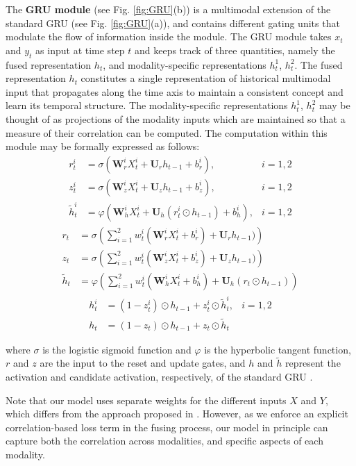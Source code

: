 \documentclass[10pt,twocolumn,letterpaper]{article}
\begin{document}
The \textbf{GRU module} (see Fig. \ref{fig:GRU}(b)) is a multimodal extension of the standard GRU (see Fig. \ref{fig:GRU}(a)), and contains different gating units that modulate the flow of information inside the module. The GRU module takes $x_t$ and $y_t$ as input at time step $t$ and keeps track of three quantities, namely the fused representation $h_t$, and modality-specific representations $h_t^1$, $h_t^2$. The fused representation $h_t$ constitutes a single representation of historical multimodal input that propagates along the time axis to maintain a consistent concept and learn its temporal structure. The modality-specific representations $h_t^1$, $h_t^2$ may be thought of as projections of the modality inputs which are maintained so that a measure of their correlation can be computed. The computation within this module may be formally expressed as follows:
\begin{align}
r_t^i &=\sigma \left( \textbf{W}_r^i  X_t^i + \textbf{U}_r  h_{t-1} + b_r^i\right ),& i=1, 2 \\
z_t^i &=\sigma \left( \textbf{W}_z^i  X_t^i + \textbf{U}_z  h_{t-1} + b_z^i\right ),& i=1, 2 \\
\tilde{h}_t^i &= \varphi \left( \textbf{W}_h^i  X_t^i + \textbf{U}_h  (r_t^i \odot h_{t-1}) + b_h^i \right),&  i=1, 2
\end{align}
\begin{align}
r_t &=\sigma \left( \sum_{i=1}^2 w_t^i \left (\textbf{W}_r^i  X_t^i + b_r^i\right) + \textbf{U}_r  h_{t-1}) \right)\\
z_t &=\sigma \left( \sum_{i=1}^2 w_t^i \left (\textbf{W}_z^i  X_t^i + b_z^i\right) + \textbf{U}_z  h_{t-1}) \right)\\
\tilde{h}_t &= \varphi \left( \sum_{i=1}^2 w_t^i \left( \textbf{W}_h^i  X_t^i + b_h^i \right) + \textbf{U}_h  (r_t \odot h_{t-1}) \right)
\end{align}
\begin{align}
h_t^i &= (1 - z_t^i) \odot h_{t-1} +  z_t^i \odot \tilde{h}_t^i, & i=1,2\\
h_t &= (1 - z_t) \odot h_{t-1} + z_t \odot \tilde{h}_t
\end{align}

\noindent where $\sigma$ is the logistic sigmoid function and $\varphi$ is the hyperbolic tangent function, $r$ and $z$ are the input to the reset and update gates, and $h$ and $\tilde{h}$ represent the activation and candidate activation, respectively, of the standard GRU \cite{ChoMGBBSB14}.

Note that our model uses separate weights for the different inputs $X$ and $Y$, which differs from the approach proposed in \cite{ren2016look}. However, as we enforce an explicit correlation-based loss term in the fusing process, our model in principle can capture both the correlation across modalities, and specific aspects of each modality. 
\end{document}
